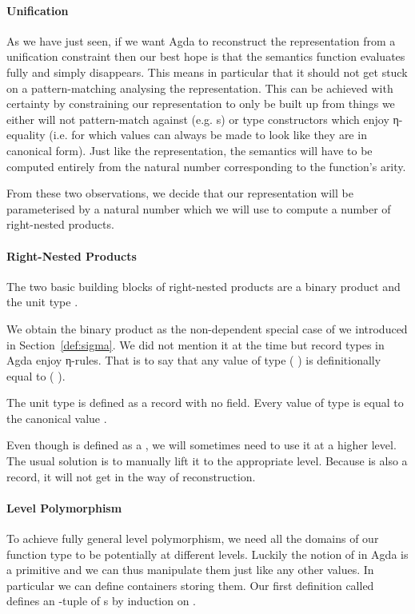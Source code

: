 \paragraph{Unification} As we have just seen, if we want Agda to reconstruct
the representation from a unification constraint then our best hope is that
the semantics function evaluates fully and simply disappears. This means in
particular that it should not get stuck on a pattern-matching analysing the
representation. This can be achieved with certainty by constraining our
representation to only be built up from things we either will not pattern-match
against (e.g. s) or type constructors which enjoy η-equality (i.e.
for which values can always be made to look like they are in canonical form).
Just like the representation, the semantics will have to be computed entirely
from the natural number corresponding to the function's arity.

From these two observations, we decide that our representation will be
parameterised by a natural number which we will use to compute a number
of right-nested products.

\paragraph{Right-Nested Products} The two basic building blocks of right-nested
products are a binary product  and the unit type .

We obtain the binary product as the non-dependent special case of  we
introduced in Section~\ref{def:sigma}. We did not mention it at the time but
record types in Agda enjoy η-rules. That is to say that any value  of type
{(  )} is definitionally equal to
{(  \AIC{,}  )}.

The unit type is defined as a record with no field. Every value of type
 is equal to the canonical value .


Even though  is defined as a , we will sometimes need to use
it at a higher level. The usual solution is to manually lift it to the
appropriate level. Because  is also a record, it will not get in the
way of reconstruction.


\paragraph{Level Polymorphism} To achieve fully general level polymorphism, we
need all the domains of our function type to be potentially at different levels.
Luckily the notion of  in Agda is a primitive  and we can thus
manipulate them just like any other values. In particular we can define containers
storing them. Our first definition called  defines an -tuple of
s by induction on .

